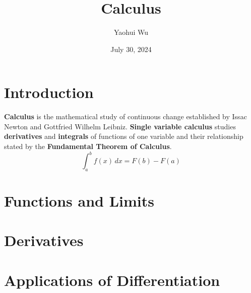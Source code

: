 \documentclass[12pt]{article}
\title{Calculus}
\author{Yaohui Wu}
\date{July 30, 2024}
\begin{document}
\maketitle

\section*{Introduction}
\textbf{Calculus} is the mathematical study of continuous change established
by Issac Newton and Gottfried Wilhelm Leibniz.
\textbf{Single variable calculus} studies \textbf{derivatives} and
\textbf{integrals} of functions of one variable and their relationship stated
by the \textbf{Fundamental Theorem of Calculus}.
\[\int_a^b f(x)\,dx=F(b)-F(a)\]

\tableofcontents
\newpage

\section{Functions and Limits}






\section{Derivatives}












\section{Applications of Differentiation}






\end{document}
